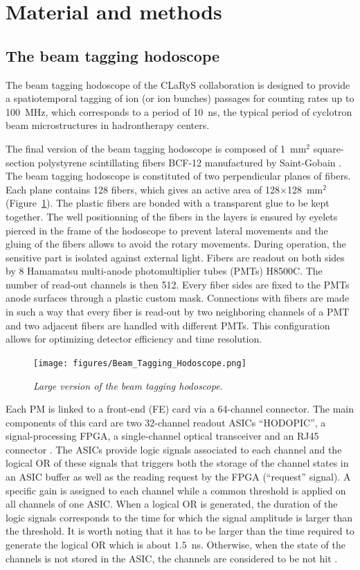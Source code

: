 \documentclass[a4paper,11pt]{article}
\begin{document}
\section{Material and methods}
\subsection{The beam tagging hodoscope}
\label{sec:hodo}

The beam tagging hodoscope of the CLaRyS collaboration is designed to provide a spatiotemporal tagging of ion (or ion bunches) passages for counting rates up to 100~MHz, which corresponds to a period of 10~ns, the typical period of cyclotron beam microstructures in hadrontherapy centers. 

The final version of the beam tagging hodoscope is composed  of 1~mm$^{2}$ square-section polystyrene scintillating fibers BCF-12 manufactured by Saint-Gobain \cite{SaintGobain2017}.
The beam tagging hodoscope is constituted of two perpendicular planes of fibers. Each plane contains 128 fibers, which gives an active area of 128$\times$128~mm$^{2}$ (Figure~\ref{fig:hodoscope}). The plastic fibers are bonded with a transparent glue to be kept together. The well positionning of the fibers in the layers is ensured by eyelets pierced in the frame of the hodoscope to prevent lateral movements and the gluing of the fibers allows to avoid the rotary movements. During operation, the sensitive part is isolated against external light. Fibers are readout on both sides by 8 Hamamatsu multi-anode photomultiplier tubes (PMTs) H8500C. The number of read-out channels is then 512. Every fiber sides are fixed to the PMTs anode surfaces through a plastic custom mask. Connections with fibers are made in such a way that every fiber is read-out by two neighboring channels of a PMT and two adjacent fibers are handled with different PMTs. This configuration allows for optimizing detector efficiency and time resolution. 

\begin{figure}[htb]
\centering
\texttt{[image: figures/Beam\_Tagging\_Hodoscope.png]}
\caption{\small{\textit{Large version of the beam tagging hodoscope.}}}
\label{fig:hodoscope}
\end{figure}

Each PM is linked to a front-end (FE) card via a 64-channel connector. The main components of this card are two 32-channel readout ASICs \enquote{HODOPIC}, a signal-processing FPGA, a single-channel optical transceiver and an RJ45 connector \cite{Chen2019}. The ASICs provide logic signals associated to each channel and the logical OR of these signals that triggers both the storage of the channel states in an ASIC buffer as well as the reading request by the FPGA (\enquote{request} signal). A specific gain is assigned to each channel while a common threshold is applied on all channels of one ASIC. When a logical OR is generated, the duration of the logic signals corresponds to the time for which the signal amplitude is larger than the threshold. It is worth noting that it has to be larger than the time required to generate the logical OR which is about $1.5$~ns. Otherwise, when the state of the channels is not stored in the ASIC, the channels are considered to be not hit .
\end{document}
